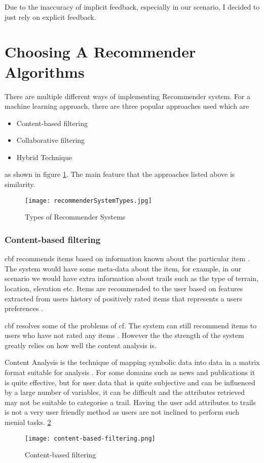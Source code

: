 Due to the inaccuracy of implicit feedback, especially in our scenario, I decided to just rely on explicit feedback.

\section{Choosing A Recommender Algorithms} \label{chooseRecAlg}
There are multiple different ways of implementing Recommender system. For a machine learning approach, there are three popular approaches used which are
\begin{itemize}
    \item Content-based filtering
    \item Collaborative filtering
    \item Hybrid Technique
\end{itemize}
as shown in figure \ref{fig:recommenderSystemTypes}. The main feature that the approaches listed above is similarity.

\begin{figure}[htb!]
    \centering
    \texttt{[image: recommenderSystemTypes.jpg]}
    \caption{Types of Recommender Systems \cite{isinkaye2015recommendation}}
    \label{fig:recommenderSystemTypes}
\end{figure}

\subsubsection{Content-based filtering}
\acrfull{cbf} recommends items based on information known about the particular item \cite{pazzani2007content}. The system would have some meta-data about the item, for example, in our scenario we would have extra information about trails such as the type of terrain, location, elevation etc. Items are recommended to the user based on features extracted from users history of positively rated items that represents a users preferences \cite{isinkaye2015recommendation}.

\acrshort{cbf} resolves some of the problems of \acrshort{cf}. The system can still recommend items to users who have not rated any items \cite{burke2002hybrid}. However the the strength of the system greatly relies on how well the content analysis is. 

Content Analysis is the technique of mapping symbolic data into data in a matrix format suitable for analysis \cite{roberts2001content}. For some domains such as news and publications it is quite effective, but for user data that is quite subjective and can be influenced by a large number of variables, it can be difficult and the attributes retrieved may not be suitable to categorise a trail. Having the user add attributes to trails is not a very user friendly method as users are not inclined to perform such menial tasks.
 \ref{fig:contentBasedFiltering}
\begin{figure}[htb!]
    \centering
    \texttt{[image: content-based-filtering.png]}
    \caption{Content-based filtering \cite{contentFiltering}}
    \label{fig:contentBasedFiltering}
\end{figure}

